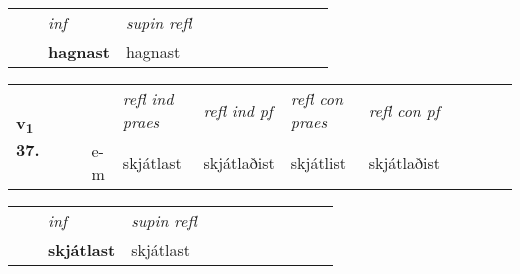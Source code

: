 \begin{tabular}{llllllllllll}
 & & \textit{inf}       & \textit{supin refl}      \\*
  & & \textbf{hagnast}        & hagnast  \\*
\cmidrule{1-12}
\end{tabular}





\begin{tabular}{llllllllllll}\toprule
\multirow{4}{*}{{{\textbf{v{\textsubscript{1}}} \Large{\textbf{37.}}}}}  & &  & &  \textit{refl ind praes} & \textit{refl ind pf} & \textit{refl con praes} & \textit{refl con pf} \\*
&  & & e-m & skjátlast & skjátlaðist & skjátlist & skjátlaðist \\*
\cmidrule{5-9}
\end{tabular}


\begin{tabular}{llllllllllll}
 & & \textit{inf}       & \textit{supin refl}      \\*
  & & \textbf{skjátlast}        & skjátlast  \\*
\cmidrule{1-12}
\end{tabular}



